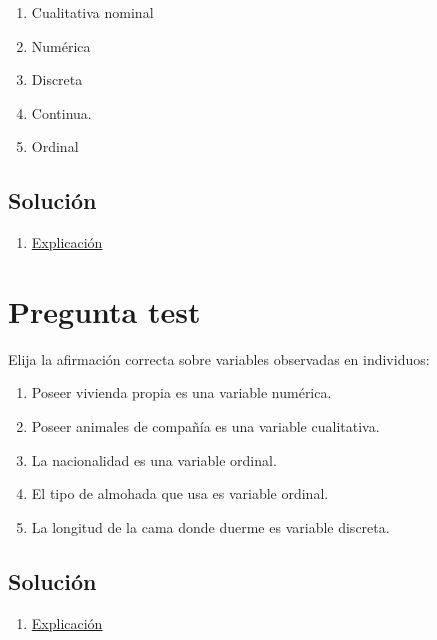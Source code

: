 \documentclass[
]{book}
\providecommand{\tightlist}{%
  \setlength{\itemsep}{0pt}\setlength{\parskip}{0pt}}
\begin{document}
\begin{enumerate}
\def\labelenumi{\alph{enumi})}
\tightlist
\item
  Cualitativa nominal
\item
  Numérica
\item
  Discreta
\item
  Continua.
\item
  Ordinal
\end{enumerate}

\hypertarget{soluciuxf3n-3}{%
\subsection{Solución}\label{soluciuxf3n-3}}

\begin{enumerate}
\def\labelenumi{\alph{enumi})}
\tightlist
\item
  \href{https://1fjmanzano.github.io/bioestadistica/tipos-de-variables.html}{Explicación}
\end{enumerate}

\hypertarget{pregunta-test-4}{%
\section{Pregunta test}\label{pregunta-test-4}}

Elija la afirmación correcta sobre variables observadas en individuos:

\begin{enumerate}
\def\labelenumi{\alph{enumi})}
\tightlist
\item
  Poseer vivienda propia es una variable numérica.
\item
  Poseer animales de compañía es una variable cualitativa.
\item
  La nacionalidad es una variable ordinal.
\item
  El tipo de almohada que usa es variable ordinal.
\item
  La longitud de la cama donde duerme es variable discreta.
\end{enumerate}

\hypertarget{soluciuxf3n-4}{%
\subsection{Solución}\label{soluciuxf3n-4}}

\begin{enumerate}
\def\labelenumi{\alph{enumi})}
\setcounter{enumi}{1}
\tightlist
\item
  \href{https://1fjmanzano.github.io/bioestadistica/tipos-de-variables.html}{Explicación}
\end{enumerate}
\end{document}
